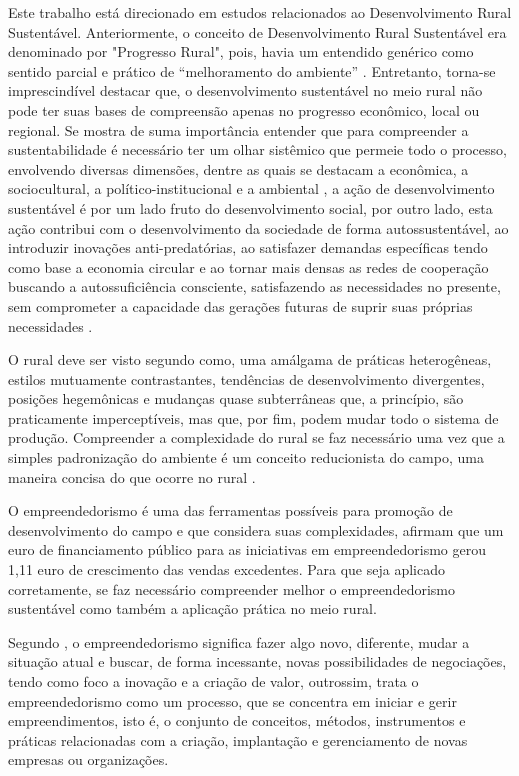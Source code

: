 Este trabalho está direcionado em estudos relacionados ao Desenvolvimento Rural Sustentável. Anteriormente, o conceito de Desenvolvimento Rural Sustentável era denominado por "Progresso Rural", pois, havia um entendido genérico como sentido parcial e prático de “melhoramento do ambiente” \cite{almeida_da_1995}. Entretanto, torna-se imprescindível destacar que, o desenvolvimento sustentável no meio rural não pode ter suas bases de compreensão apenas no progresso econômico, local ou regional. 
Se mostra de suma importância entender que para compreender a sustentabilidade é necessário ter um olhar sistêmico que permeie todo o processo, envolvendo diversas dimensões, dentre as quais se destacam a econômica, a sociocultural, a político-institucional e a ambiental \cite{vieira_politica_2015}, a ação de desenvolvimento sustentável é por um lado fruto do desenvolvimento social, por outro lado, esta ação contribui com o desenvolvimento da sociedade de forma autossustentável, ao introduzir inovações anti-predatórias, ao satisfazer demandas específicas tendo como base a economia circular e ao tornar mais densas as redes de cooperação buscando a autossuficiência consciente, satisfazendo as necessidades no presente, sem comprometer a capacidade das gerações futuras de suprir suas próprias necessidades \cite{onu_sustainable_2016}.


O rural deve ser visto segundo \cite{kageyama_desenvolvimento_2008} como, uma amálgama de práticas heterogêneas, estilos mutuamente contrastantes, tendências de desenvolvimento divergentes, posições hegemônicas e mudanças quase subterrâneas que, a princípio, são praticamente imperceptíveis, mas que, por fim, podem mudar todo o sistema de produção. Compreender a complexidade do rural se faz necessário uma vez que a simples padronização do ambiente é um conceito reducionista do campo, uma maneira concisa do que ocorre no rural \cite{van_der_ploeg_trajetorias_2011}. 

O empreendedorismo é uma das ferramentas possíveis para promoção de desenvolvimento do campo e que considera suas complexidades,   afirmam que um euro de financiamento público para as iniciativas em empreendedorismo gerou 1,11 euro de crescimento das vendas excedentes. Para que seja aplicado corretamente, se faz necessário compreender melhor o empreendedorismo sustentável como também a aplicação prática no meio rural. 

Segundo , o empreendedorismo significa fazer algo novo, diferente, mudar a situação atual e buscar, de forma incessante, novas possibilidades de negociações, tendo como foco a inovação e a criação de valor, outrossim,  trata o empreendedorismo como  um  processo,  que se concentra em iniciar  e  gerir  empreendimentos,  isto  é,  o conjunto  de  conceitos,  métodos,  instrumentos  e  práticas  relacionadas  com  a criação, implantação  e  gerenciamento de novas  empresas  ou organizações.

